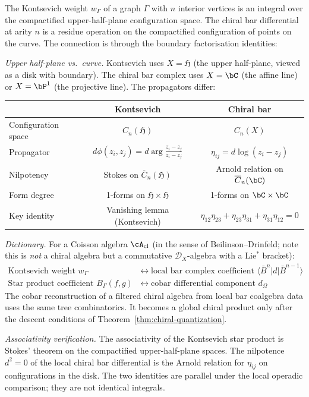 \begin{computation}
\label{comp:kontsevich-bar-connection}

The Kontsevich weight $w_\Gamma$ of a graph $\Gamma$ with $n$
interior vertices is an integral over the compactified
upper-half-plane configuration space. The chiral bar differential at
arity $n$ is a residue operation on the compactified configuration of
points on the curve. The connection is through the boundary
factorisation identities:

\emph{Upper half-plane vs.\ curve.}
Kontsevich uses $X = \mathfrak{H}$ (the upper half-plane, viewed as
a disk with boundary). The chiral bar complex uses $X = \bC$ (the
affine line) or $X = \bP^1$ (the projective line). The propagators
differ:
\begin{center}
\renewcommand{\arraystretch}{1.2}
\begin{tabular}{l|cc}
& Kontsevich & Chiral bar \\
\hline
Configuration space & $C_n(\mathfrak{H})$ & $C_n(X)$ \\
Propagator & $d\phi(z_i, z_j) = d\arg\frac{z_i - z_j}
{\bar{z}_i - z_j}$ &
$\eta_{ij} = d\log(z_i - z_j)$ \\
Nilpotency & Stokes on $\overline{C}_n(\mathfrak{H})$ &
Arnold relation on $\overline{C}_n(\bC)$ \\
Form degree & 1-forms on $\mathfrak{H} \times \mathfrak{H}$ &
1-forms on $\bC \times \bC$ \\
Key identity & Vanishing lemma (Kontsevich) &
$\eta_{12}\eta_{23} + \eta_{23}\eta_{31} + \eta_{31}\eta_{12} = 0$
\end{tabular}
\end{center}

\emph{Dictionary.}
For a Coisson algebra $\cA_{\mathrm{cl}}$
(in the sense of Beilinson--Drinfeld; note this is \emph{not} a chiral algebra but a commutative $\mathcal{D}_X$-algebra with a Lie$^*$ bracket):
\begin{align}
\text{Kontsevich weight } w_\Gamma
&\longleftrightarrow
\text{local bar complex coefficient }
\langle \bar{B}^n | d | \bar{B}^{n-1} \rangle \\
\text{Star product coefficient } B_\Gamma(f,g)
&\longleftrightarrow
\text{cobar differential component } d_\Omega
\end{align}
The cobar reconstruction of a filtered chiral algebra from local bar
coalgebra data uses the same tree combinatorics. It becomes a global
chiral product only after the descent conditions of
Theorem~\ref{thm:chiral-quantization}.

\emph{Associativity verification.}
The associativity of the Kontsevich star product is Stokes' theorem on
the compactified upper-half-plane spaces. The nilpotence $d^2=0$ of
the local chiral bar differential is the Arnold relation for
\(\eta_{ij}\) on configurations in the disk. The two identities are
parallel under the local operadic comparison; they are not identical
integrals.
\end{computation}


